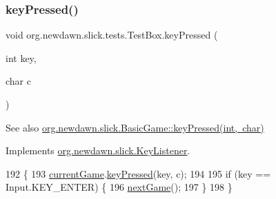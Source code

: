 \mbox{\label{classorg_1_1newdawn_1_1slick_1_1tests_1_1_test_box_a8904ce9d53be074ca40305c27133a1d0}} 
\subsubsection{\texorpdfstring{key\+Pressed()}{keyPressed()}}
{\footnotesize\ttfamily void org.\+newdawn.\+slick.\+tests.\+Test\+Box.\+key\+Pressed (\begin{DoxyParamCaption}\item[{int}]{key,  }\item[{char}]{c }\end{DoxyParamCaption})\hspace{0.3cm}{\ttfamily [inline]}}

\begin{DoxySeeAlso}{See also}
\mbox{\hyperlink{classorg_1_1newdawn_1_1slick_1_1_basic_game_a4fbb3345b5abf5ddd54a99466d07f02f}{org.\+newdawn.\+slick.\+Basic\+Game\+::key\+Pressed(int, char)}} 
\end{DoxySeeAlso}


Implements \mbox{\hyperlink{interfaceorg_1_1newdawn_1_1slick_1_1_key_listener_ac0b0568a21ef486c4f51382614c196ef}{org.\+newdawn.\+slick.\+Key\+Listener}}.


\begin{DoxyCode}
192                                             \{
193         \mbox{\hyperlink{classorg_1_1newdawn_1_1slick_1_1tests_1_1_test_box_a5e0fdb2f97173d828af597044c525078}{currentGame}}.\mbox{\hyperlink{classorg_1_1newdawn_1_1slick_1_1_basic_game_a4fbb3345b5abf5ddd54a99466d07f02f}{keyPressed}}(key, c);
194         
195         \textcolor{keywordflow}{if} (key == Input.KEY\_ENTER) \{
196             \mbox{\hyperlink{classorg_1_1newdawn_1_1slick_1_1tests_1_1_test_box_ad4155fd01658dadab9faef499d5db7d3}{nextGame}}();
197         \}
198     \}
\end{DoxyCode}
\mbox{\label{classorg_1_1newdawn_1_1slick_1_1tests_1_1_test_box_a8085084aafdff326cab6a2a6d319e367}} 
